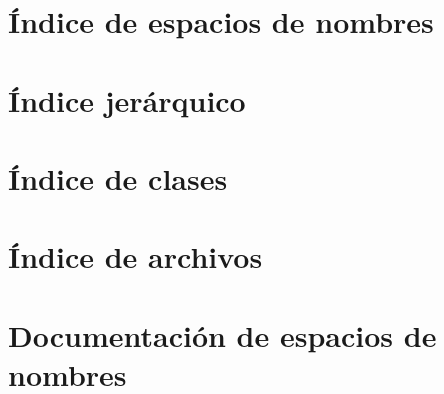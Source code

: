 \documentclass[twoside]{book}
\newcommand{\+}{\discretionary{\mbox{\scriptsize$\hookleftarrow$}}{}{}}
\begin{document}
\chapter{Índice de espacios de nombres}

\chapter{Índice jerárquico}

\chapter{Índice de clases}

\chapter{Índice de archivos}

\chapter{Documentación de espacios de nombres}






































\end{document}
